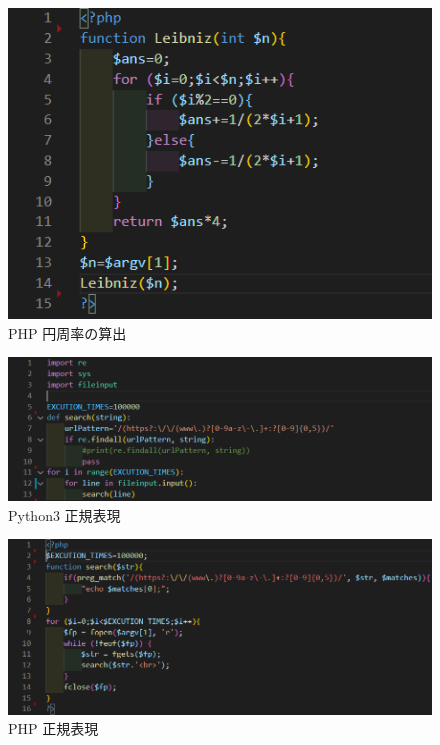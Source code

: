 \begin{figure}[tb]
    \centering
    \includegraphics[width=13.5cm,keepaspectratio]{figure/p-php.PNG}
    \caption{PHP 円周率の算出}
    \label{fig:p-php}
\end{figure}
\begin{figure}[tb]
    \centering
        \includegraphics[width=13.5cm,keepaspectratio]{figure/s-py.PNG}
        \caption{Python3 正規表現}
        \label{fig:s-py}
\end{figure}

\begin{figure}[tb]
    \centering
        \includegraphics[width=13.5cm,keepaspectratio]{figure/s-php.PNG}
        \caption{PHP 正規表現}
        \label{fig:s-php}
\end{figure}
